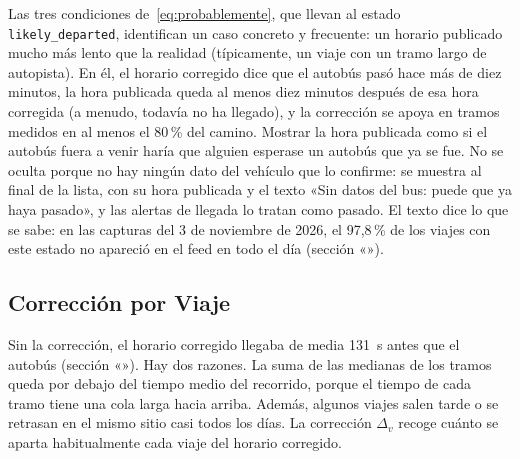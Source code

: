 Las tres condiciones de~\eqref{eq:probablemente}, que llevan al estado \texttt{likely\_departed}, identifican un caso
concreto y frecuente: un horario publicado mucho más lento que la realidad (típicamente, un viaje con un tramo largo de
autopista). En él, el horario corregido dice que el autobús pasó hace más de diez minutos, la hora publicada queda al
menos diez minutos después de esa hora corregida (a menudo, todavía no ha llegado), y la corrección se apoya en tramos medidos en al menos el 80\,\% del camino. Mostrar la
hora publicada como si el autobús fuera a venir haría que alguien esperase un autobús que ya se fue. No se oculta
porque no hay ningún dato del vehículo que lo confirme: se muestra al final de la lista, con su hora publicada y el
texto «Sin datos del bus: puede que ya haya pasado», y las alertas de llegada lo tratan como pasado. El texto dice lo que
se sabe: en las capturas del 3 de noviembre de 2026, el 97{,}8\,\% de los viajes con este estado no apareció en el feed
en todo el día (sección «»).

\subsection{Corrección por Viaje}
\label{sec:correccion-viaje}

Sin la corrección, el horario corregido llegaba de media 131~s antes que el autobús (sección
«»). Hay dos razones. La suma de las medianas de los tramos queda por debajo del tiempo
medio del recorrido, porque el tiempo de cada tramo tiene una cola larga hacia arriba. Además, algunos viajes salen tarde
o se retrasan en el mismo sitio casi todos los días. La corrección $\Delta_v$ recoge cuánto se aparta habitualmente cada
viaje del horario corregido.

